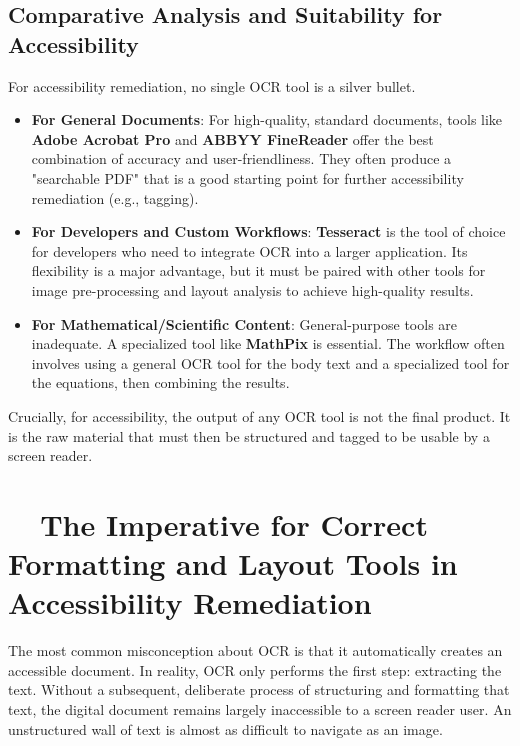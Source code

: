\subsection{Comparative Analysis and Suitability for Accessibility}
\label{subsec:ocr-comparative-analysis}
For accessibility remediation, no single OCR tool is a silver bullet.
\begin{itemize}
	\item \textbf{For General Documents}: For high-quality, standard documents, tools like \textbf{Adobe Acrobat Pro} and \textbf{ABBYY FineReader} offer the best combination of accuracy and user-friendliness. They often produce a "searchable PDF" that is a good starting point for further accessibility remediation (e.g., tagging).
	\item \textbf{For Developers and Custom Workflows}: \textbf{Tesseract} is the tool of choice for developers who need to integrate OCR into a larger application. Its flexibility is a major advantage, but it must be paired with other tools for image pre-processing and layout analysis to achieve high-quality results.
	\item \textbf{For Mathematical/Scientific Content}: General-purpose tools are inadequate. A specialized tool like \textbf{MathPix} is essential. The workflow often involves using a general OCR tool for the body text and a specialized tool for the equations, then combining the results.
\end{itemize}
Crucially, for accessibility, the output of any OCR tool is not the final product. It is the raw material that must then be structured and tagged to be usable by a screen reader.

\section{~~The Imperative for Correct Formatting and Layout Tools in Accessibility Remediation}
\label{sec:ocr-remediation}
The most common misconception about OCR is that it automatically creates an accessible document. In reality, OCR only performs the first step: extracting the text. Without a subsequent, deliberate process of structuring and formatting that text, the digital document remains largely inaccessible to a screen reader user. An unstructured wall of text is almost as difficult to navigate as an image.

